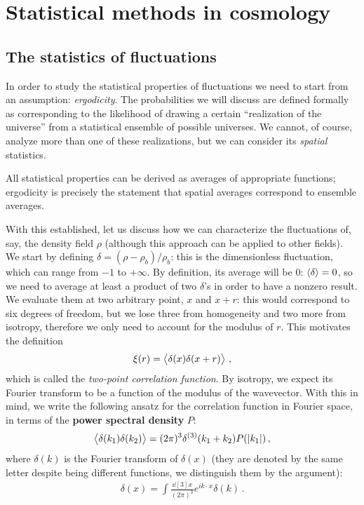 \documentclass[main.tex]{subfiles}
\begin{document}
\section{Statistical methods in cosmology}



\subsection{The statistics of fluctuations}

In order to study the statistical properties of fluctuations we need to start from an assumption: \emph{ergodicity}. 
The probabilities we will discuss are defined formally as corresponding to the likelihood of drawing a certain ``realization of the universe'' from a statistical ensemble of possible universes. 
We cannot, of course, analyze more than one of these realizations, but we can consider its \emph{spatial} statistics. 

All statistical properties can be derived as averages of appropriate functions; ergodicity is precisely the statement that spatial averages correspond to ensemble averages. 

With this established, let us discuss how we can characterize the fluctuations of, say, the density field \(\rho \) (although this approach can be applied to other fields). 
We start by defining \(\delta = (\rho - \rho_b) / \rho_b\):  this is the dimensionless fluctuation, which can range from \(-1\) to \(+ \infty \).
By definition, its average will be 0: \(\expval{ \delta } = 0\), so we need to average at least a product of two \(\delta \)'s in order to have a nonzero result. 
We evaluate them at two arbitrary point, \(x\) and \(x + r\): this would correspond to six degrees of freedom, but we lose three from homogeneity and two more from isotropy, therefore we only need to account for the modulus of \(r\). This motivates the definition 
%
\begin{align}
\xi (r) = \expval{ \delta (x) \delta (x+r)} 
\,,
\end{align}
%
which is called the \emph{two-point correlation function}.
By isotropy, we expect its Fourier transform to be a function of the modulus of the wavevector.
With this in mind, we write the following ansatz for the correlation function in Fourier space, in terms of the \textbf{power spectral density} \(P\): 
%
\begin{align}
\expval{ \delta (k_1 ) \delta (k_2)} = (2 \pi )^3 \delta^{(3)}(k_1 + k_2 ) P(\abs{k_1 })
\,,
\end{align}
%
where \(\delta (k)\) is the Fourier transform of \(\delta (x)\) (they are denoted by the same letter despite being different functions, we distinguish them by the argument): 
%
\begin{align}
\delta (x) = \int \frac{ \dd[3]{x}}{(2 \pi )^3} e^{i k \cdot x} \delta (k)
\,.
\end{align}
% 
\end{document}
